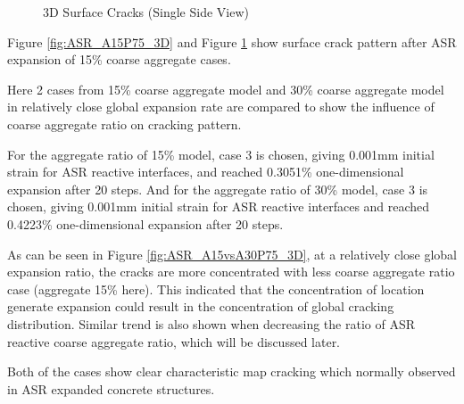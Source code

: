 \begin{figure}[!h]
  \caption{3D Surface Cracks (Single Side View)}
  \label{fig:ASR_A15P75_3DS}
\end{figure}

Figure \ref{fig:ASR_A15P75_3D} and Figure \ref{fig:ASR_A15P75_3DS} show surface crack pattern after ASR expansion of 15\% coarse aggregate cases.

Here 2 cases from 15\% coarse aggregate model and 30\% coarse aggregate model in relatively close global expansion rate are compared to show the influence of coarse aggregate ratio on cracking pattern.

For the aggregate ratio of 15\% model, case 3 is chosen, giving 0.001mm initial strain for ASR reactive interfaces, and reached 0.3051\% one-dimensional expansion after 20 steps. And for the aggregate ratio of 30\% model, case 3 is chosen, giving 0.001mm initial strain for ASR reactive interfaces and reached 0.4223\% one-dimensional expansion after 20 steps.


As can be seen in Figure \ref{fig:ASR_A15vsA30P75_3D}, at a relatively close global expansion ratio, the cracks are more concentrated with less coarse aggregate ratio case (aggregate 15\% here). This indicated that the concentration of location generate expansion could result in the concentration of global cracking distribution. Similar trend is also shown when decreasing the ratio of ASR reactive coarse aggregate ratio, which will be discussed later.

Both of the cases show clear characteristic map cracking which normally observed in ASR expanded concrete structures.

